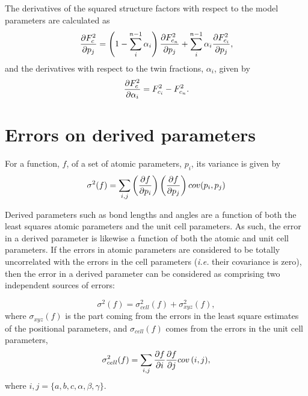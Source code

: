 \documentclass[pdf]{iucr}
\begin{document}
The derivatives of the squared structure factors with respect to the model parameters are calculated as
\begin{equation}
\frac{\partial F_c^2}{\partial p_j} = \left(1-\sum_i^{n-1}{\alpha_i}\right) \frac{\partial F_{c_n}^2}{\partial p_j} + \sum_i^{n-1}{\alpha_i \frac{\partial F_{c_i}^2}{\partial p_j}}
\label{eqn:twin_grads},
\end{equation}
and the derivatives with respect to the twin fractions, $\alpha_i$, given by
\begin{equation}
\frac{\partial F_c^2}{\partial \alpha_i} = F_{c_i}^2 - F_{c_n}^2
\label{eqn:twin_fraction_grads}.
\end{equation}





\section{Errors on derived parameters}
\label{sec:errors}

For a function, $f$, of a set of atomic parameters, $p_i$, its variance is given by \cite{Sands:a05356}
\begin{equation}
\sigma^2(f) = \sum_{i,j}{\left(\frac{\partial f}{\partial p_i}\right) \left(\frac{\partial f}{\partial p_j}\right) cov(p_i,p_j)}
\label{eqn:sigma_f}
\end{equation}

Derived parameters such as bond lengths and angles are a function of both the least squares atomic parameters and the unit cell parameters. As such, the error in a derived parameter is likewise a function of both the atomic and unit cell parameters. If the errors in atomic parameters are considered to be totally uncorrelated with the errors in the cell parameters (\emph{i.e.} their covariance is zero), then the error in a derived parameter can be considered as comprising two independent sources of errors:

\begin{equation}
\sigma^2(f) = \sigma^2_{cell}(f) + \sigma^2_{xyz}(f)
\label{eqn:sigma_d},
\end{equation}
where $\sigma_{xyz}(f)$ is the part coming from the errors in the least square estimates of the positional parameters, and $\sigma_{cell}(f)$ comes from the errors in the unit cell parameters,
\begin{equation}
\sigma^2_{cell}(f) = \sum_{i,j}{{\frac{\partial f}{\partial i}\frac{\partial f}{\partial j} cov\left(i,j\right)}}
\label{eqn:sigma_cell},
\end{equation}
where $i,j=\lbrace{a,b,c,\alpha,\beta,\gamma\rbrace}$.
\end{document}
